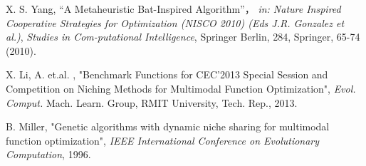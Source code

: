 \documentclass[twocolumn, a4paper]{UECIEresume}
\begin{document}
{\small
\begin{thebibliography}{*}
 X. S. Yang, “A Metaheuristic Bat-Inspired Algorithm”， {\it in: Nature Inspired Cooperative Strategies for Optimization (NISCO 2010) (Eds J.R. Gonzalez et al.)}, {\it Studies in Com-putational Intelligence}, Springer Berlin, 284, Springer, 65-74 (2010).


 X. Li, A. et.al. , "Benchmark Functions for CEC'2013 Special Session and Competition on Niching Methods for Multimodal Function Optimization", {\it Evol. Comput.} Mach. Learn. Group, RMIT University, Tech. Rep., 2013.


 B. Miller, "Genetic algorithms with dynamic niche sharing for multimodal function optimization", {\it IEEE International Conference on Evolutionary Computation}, 1996.
\end{thebibliography}
}
\end{document}
